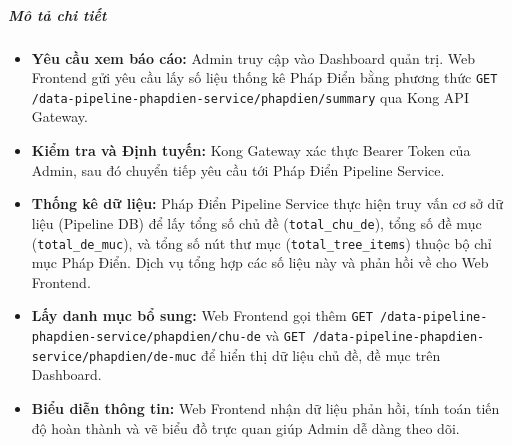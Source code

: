 \subparagraph{Mô tả chi tiết}
\begin{itemize}
\item \textbf{Yêu cầu xem báo cáo:} Admin truy cập vào Dashboard quản trị. Web Frontend gửi yêu cầu lấy số liệu thống kê Pháp Điển bằng phương thức \texttt{GET /data-pipeline-phapdien-service/phapdien/summary} qua Kong API Gateway.
\item \textbf{Kiểm tra và Định tuyến:} Kong Gateway xác thực Bearer Token của Admin, sau đó chuyển tiếp yêu cầu tới Pháp Điển Pipeline Service.
\item \textbf{Thống kê dữ liệu:} Pháp Điển Pipeline Service thực hiện truy vấn cơ sở dữ liệu (Pipeline DB) để lấy tổng số chủ đề (\texttt{total\_chu\_de}), tổng số đề mục (\texttt{total\_de\_muc}), và tổng số nút thư mục (\texttt{total\_tree\_items}) thuộc bộ chỉ mục Pháp Điển. Dịch vụ tổng hợp các số liệu này và phản hồi về cho Web Frontend.
\item \textbf{Lấy danh mục bổ sung:} Web Frontend gọi thêm \texttt{GET /data-pipeline-phapdien-service/phapdien/chu-de} và \texttt{GET /data-pipeline-phapdien-service/phapdien/de-muc} để hiển thị dữ liệu chủ đề, đề mục trên Dashboard.
\item \textbf{Biểu diễn thông tin:} Web Frontend nhận dữ liệu phản hồi, tính toán tiến độ hoàn thành và vẽ biểu đồ trực quan giúp Admin dễ dàng theo dõi.
\end{itemize}
